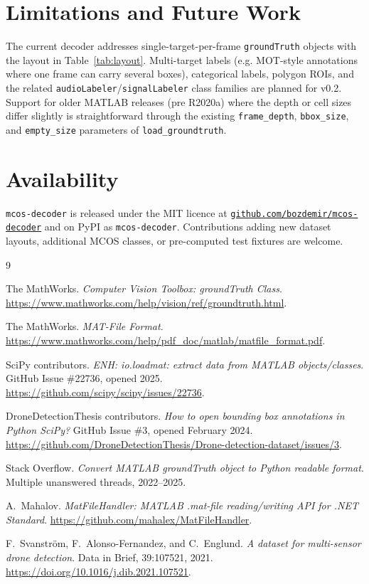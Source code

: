 \documentclass[10pt]{article}
\begin{document}
\section{Limitations and Future Work}

The current decoder addresses single-target-per-frame
\texttt{groundTruth} objects with the layout in
Table~\ref{tab:layout}. Multi-target labels (e.g. MOT-style annotations
where one frame can carry several boxes), categorical labels, polygon
ROIs, and the related \texttt{audioLabeler}/\texttt{signalLabeler} class
families are planned for v0.2. Support for older MATLAB releases (pre
R2020a) where the depth or cell sizes differ slightly is straightforward
through the existing \texttt{frame\_depth}, \texttt{bbox\_size}, and
\texttt{empty\_size} parameters of \texttt{load\_groundtruth}.

\section{Availability}

\texttt{mcos-decoder} is released under the MIT licence at
\href{https://github.com/bozdemir/mcos-decoder}{\texttt{github.com/bozdemir/mcos-decoder}}
and on PyPI as \texttt{mcos-decoder}. Contributions adding new dataset
layouts, additional MCOS classes, or pre-computed test fixtures are
welcome.


\begin{thebibliography}{9}

The MathWorks. \emph{Computer Vision Toolbox: groundTruth Class}.
\url{https://www.mathworks.com/help/vision/ref/groundtruth.html}.

The MathWorks. \emph{MAT-File Format}.
\url{https://www.mathworks.com/help/pdf_doc/matlab/matfile_format.pdf}.

SciPy contributors. \emph{ENH: io.loadmat: extract data from MATLAB
objects/classes}. GitHub Issue \#22736, opened 2025.
\url{https://github.com/scipy/scipy/issues/22736}.

DroneDetectionThesis contributors. \emph{How to open bounding box
annotations in Python SciPy?} GitHub Issue \#3, opened February 2024.
\url{https://github.com/DroneDetectionThesis/Drone-detection-dataset/issues/3}.

Stack Overflow. \emph{Convert MATLAB groundTruth object to Python
readable format}. Multiple unanswered threads, 2022--2025.

A.~Mahalov. \emph{MatFileHandler: MATLAB .mat-file reading/writing API
for .NET Standard}.
\url{https://github.com/mahalex/MatFileHandler}.

F.~Svanström, F.~Alonso-Fernandez, and C.~Englund.
\emph{A dataset for multi-sensor drone detection}.
Data in Brief, 39:107521, 2021.
\url{https://doi.org/10.1016/j.dib.2021.107521}.

\end{thebibliography}
\end{document}
